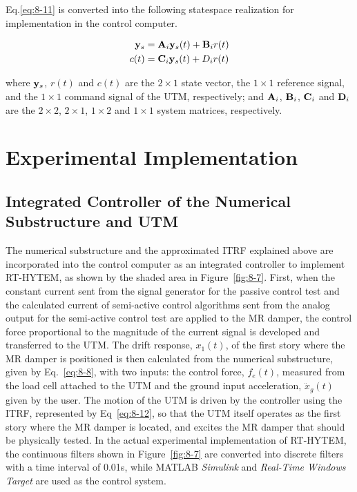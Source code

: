 Eq.\eqref{eq:8-11} is converted into the following statespace realization for implementation in the control computer.

\begin{equation}\label{eq:8-12}
\begin{aligned}
\mathbf{y}_{s} & = \mathbf{A}_{i}\mathbf{y}_{s}(t) + \mathbf{B}_{i}r(t) \\
c(t) &= \mathbf{C}_{i}\mathbf{y}_{s}(t) + D_{i}r(t)
\end{aligned}
\end{equation}

where $\mathbf{y}_{s}$, $r(t)$ and $c(t)$ are the $2\times1$ state vector, the $1\times1$ reference signal, and the $1\times1$ command signal of the UTM, respectively; and $\mathbf{A}_{i}$, $\mathbf{B}_{i}$, $\mathbf{C}_{i}$ and $\mathbf{D}_{i}$ are the $2\times2$, $2\times1$, $1\times2$ and $1\times1$ system matrices, respectively.

\section{Experimental Implementation}
\subsection{Integrated Controller of the Numerical Substructure and UTM}

The numerical substructure and the approximated ITRF explained above are incorporated into the control computer as an integrated controller to implement RT-HYTEM, as shown by the shaded area in Figure~\ref{fig:8-7}. First, when the constant current sent from the signal generator for the passive control test and the calculated current of semi-active control algorithms sent from the analog output for the semi-active control test are applied to the MR damper, the control force proportional to the magnitude of the current signal is developed and transferred to the UTM. The drift response, $x_{1}(t)$, of the first story where the MR damper is positioned is then calculated from the numerical substructure, given by Eq.~\eqref{eq:8-8}, with two inputs: the control force, $f_{e}(t)$, measured from the load cell attached to the UTM and the ground input acceleration, $\ddot{x}_{g}(t)$ given by the user. The motion of the UTM is driven by the controller using the ITRF, represented by Eq~\eqref{eq:8-12}, so that the UTM itself operates as the first story where the MR damper is located, and excites the MR damper that should be physically tested. In the actual experimental implementation of RT-HYTEM, the continuous filters shown in Figure~\ref{fig:8-7} are converted into discrete filters with a time interval of 0.01s, while MATLAB \textit{Simulink}\citep{simulink2009version} and \textit{Real-Time Windows Target}\citep{targetuser} are used as the control system.

